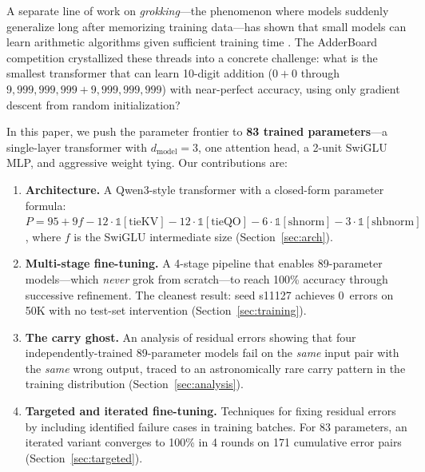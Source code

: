\documentclass[11pt]{article}
\begin{document}
A separate line of work on \emph{grokking}---the phenomenon where models
suddenly generalize long after memorizing training data---has shown that
small models can learn arithmetic algorithms given sufficient training
time \citep{power2022grokking, nanda2023grokking}. The AdderBoard
competition \citep{adderboard2025} crystallized these threads into a
concrete challenge: what is the smallest transformer that can learn
10-digit addition ($0 + 0$ through $9{,}999{,}999{,}999 +
9{,}999{,}999{,}999$) with near-perfect accuracy, using only gradient
descent from random initialization?

In this paper, we push the parameter frontier to \textbf{83 trained
parameters}---a single-layer transformer with $d_\text{model}=3$, one
attention head, a 2-unit SwiGLU MLP, and aggressive weight tying. Our
contributions are:

\begin{enumerate}[leftmargin=*, itemsep=2pt]
  \item \textbf{Architecture.} A Qwen3-style transformer with a closed-form
    parameter formula:
    $P = 95 + 9f - 12 \cdot \mathds{1}[\text{tieKV}] - 12 \cdot
    \mathds{1}[\text{tieQO}] - 6 \cdot \mathds{1}[\text{shnorm}] - 3 \cdot
    \mathds{1}[\text{shbnorm}]$, where $f$ is the SwiGLU intermediate size
    (Section~\ref{sec:arch}).

  \item \textbf{Multi-stage fine-tuning.} A 4-stage pipeline that enables
    89-parameter models---which \emph{never} grok from scratch---to reach 100\%
    accuracy through successive refinement. The cleanest result: seed s11127
    achieves 0~errors on 50K with no test-set intervention
    (Section~\ref{sec:training}).

  \item \textbf{The carry ghost.} An analysis of residual errors showing that
    four independently-trained 89-parameter models fail on the
    \emph{same} input pair with the \emph{same} wrong output, traced to
    an astronomically rare carry pattern in the training distribution
    (Section~\ref{sec:analysis}).

  \item \textbf{Targeted and iterated fine-tuning.} Techniques for fixing
    residual errors by including identified failure cases in training batches.
    For 83 parameters, an iterated variant converges to 100\% in 4 rounds on
    171 cumulative error pairs (Section~\ref{sec:targeted}).
\end{enumerate}
\end{document}
